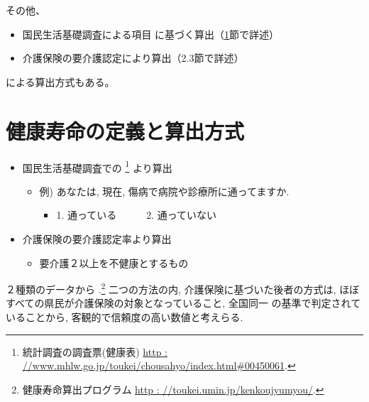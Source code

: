 その他、

\begin{itemize}
\item 国民生活基礎調査による項目  に基づく算出（\ref{survey}節で詳述）
\item 介護保険の要介護認定により算出（2.3節で詳述）
\end{itemize}
による算出方式もある。



\section{健康寿命の定義と算出方式}
\label{survey}
%

\begin{itemize} \setlength{\itemsep}{-0.5mm} \setlength{\parskip}{-0.5mm}
	\item 国民生活基礎調査での
\footnote{
		      統計調査の調査票(健康表)
		      \url{http : //www.mhlw.go.jp/toukei/chousahyo/index.html#00450061}.
	      }
	      より算出
	      \begin{itemize} \setlength{\itemsep}{-0.5mm} \setlength{\parskip}{-0.5mm}
		      \item 例) あなたは, 現在, 傷病で病院や診療所に通ってますか.
		            \begin{itemize} \setlength{\itemsep}{-0.5mm} \setlength{\parskip}{-0.5mm}
			            \item[] 1. 通っている~~~~~~2. 通っていない
		            \end{itemize}
	      \end{itemize}

	\item 介護保険の要介護認定率より算出
	      \begin{itemize} \setlength{\itemsep}{-0.5mm} \setlength{\parskip}{-0.5mm}
		      \item 要介護２以上を不健康とするもの
	      \end{itemize}
\end{itemize}
２種類のデータから
.\footnote{
	健康寿命算出プログラム
	\url{http : //toukei.umin.jp/kenkoujyumyou/}.
}
二つの方法の内, 介護保険に基づいた後者の方式は,
ほぼすべての県民が介護保険の対象となっていること, 全国同一
の基準で判定されていることから, 客観的で信頼度の高い数値と考えらる.




